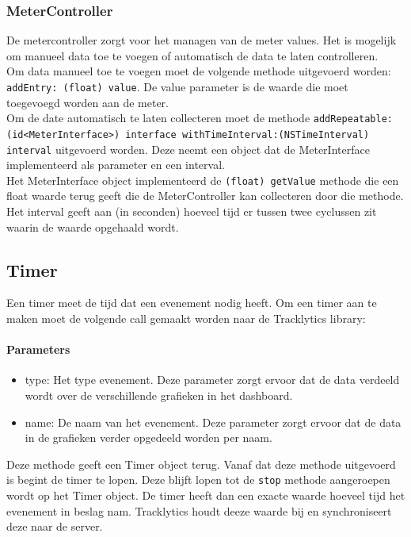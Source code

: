 \subsubsection{MeterController}
De metercontroller zorgt voor het managen van de meter values. Het is mogelijk om manueel data toe te voegen of automatisch de data te laten controlleren. \\

Om data manueel toe te voegen moet de volgende methode uitgevoerd worden: \texttt{\justify addEntry: (float) value}. De value parameter is de waarde die moet toegevoegd worden aan de meter. \\

Om de date automatisch te laten collecteren moet de methode \texttt{\justify addRepeatable:(id<MeterInterface>) interface withTimeInterval:(NSTimeInterval) interval} uitgevoerd worden. Deze neemt een object dat de MeterInterface implementeerd als parameter en een interval.\\
Het MeterInterface object implementeerd de \texttt{\justify (float) getValue} methode die een float waarde terug geeft die de MeterController kan collecteren door die methode.\\
Het interval geeft aan (in seconden) hoeveel tijd er tussen twee cyclussen zit waarin de waarde opgehaald wordt.

\subsection{Timer}
Een timer meet de tijd dat een evenement nodig heeft. Om een timer aan te maken moet de volgende call gemaakt worden naar de Tracklytics library: \texttt{} 

\paragraph{Parameters}
\begin{itemize}
\item type: Het type evenement. Deze parameter zorgt ervoor dat de data verdeeld wordt over de verschillende grafieken in het dashboard.
\item name: De naam van het evenement. Deze parameter zorgt ervoor dat de data in de grafieken verder opgedeeld worden per naam.
\end{itemize} 

Deze methode geeft een Timer object terug. Vanaf dat deze methode uitgevoerd is begint de timer te lopen. Deze blijft lopen tot de \texttt{\justify stop} methode aangeroepen wordt op het Timer object. De timer heeft dan een exacte waarde hoeveel tijd het evenement in beslag nam. Tracklytics houdt deeze waarde bij en synchroniseert deze naar de server. 


